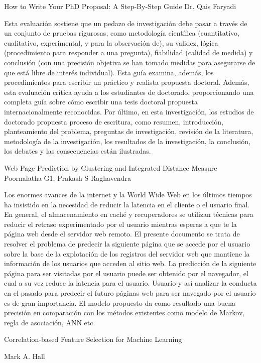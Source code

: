 How to Write Your PhD Proposal: A Step-By-Step Guide
Dr. Qais Faryadi

Esta evaluación sostiene que un pedazo de investigación debe pasar a través de un conjunto de pruebas rigurosas, como metodología científica (cuantitativo, cualitativo, experimental, y para la observación de), su validez, lógica (procedimiento para responder a una pregunta), fiabilidad (calidad de medida) y conclusión (con una precisión objetiva se han tomado medidas para asegurarse de que está libre de interés individual).  Esta guía examina, además, los procedimientos para escribir un práctico y realista propuesta doctoral. Además, esta evaluación crítica ayuda a los estudiantes de doctorado, proporcionando una completa guía sobre cómo escribir una tesis doctoral propuesta internacionalmente reconocidas. Por último, en esta investigación, los estudios de doctorado propuesta proceso de escritura, como resumen, introducción, planteamiento del problema, preguntas de investigación, revisión de la literatura, metodología de la investigación, los resultados de la investigación, la conclusión, los debates y las consecuencias están ilustradas.


Web Page Prediction by Clustering and Integrated Distance Measure
Poornalatha G1, Prakash S Raghavendra

Los enormes avances de la internet y la World Wide Web en los últimos tiempos ha insistido en la necesidad de reducir la latencia en el cliente o el usuario final. En general, el almacenamiento en caché y recuperadores se utilizan técnicas para reducir el retraso experimentado por el usuario mientras esperas a que te la página web desde el servidor web remoto. El presente documento se trata de resolver el problema de predecir la siguiente página que se accede por el usuario sobre la base de la explotación de los registros del servidor web que mantiene la información de los usuarios que acceden al sitio web. La predicción de la siguiente página para ser visitadas por el usuario puede ser obtenido por el navegador, el cual a su vez reduce la latencia para el usuario. Usuario y así analizar la conducta en el pasado para predecir el futuro páginas web para ser navegado por el usuario es de gran importancia. El modelo propuesto da como resultado una buena precisión en comparación con los métodos existentes como modelo de Markov, regla de asociación, ANN etc.


Correlation-based Feature Selection for Machine Learning

Mark A. Hall

